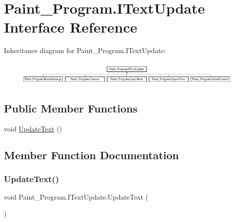 \hypertarget{interface_paint___program_1_1_i_text_update}{}\section{Paint\+\_\+\+Program.\+I\+Text\+Update Interface Reference}
\label{interface_paint___program_1_1_i_text_update}
Inheritance diagram for Paint\+\_\+\+Program.\+I\+Text\+Update\+:\begin{figure}[H]
\begin{center}
\leavevmode
\includegraphics[height=1.217391cm]{interface_paint___program_1_1_i_text_update}
\end{center}
\end{figure}
\subsection*{Public Member Functions}
\begin{DoxyCompactItemize}
\item 
void \mbox{\hyperlink{interface_paint___program_1_1_i_text_update_ad1e94db137571608917117e9a6f7479b}{Update\+Text}} ()
\end{DoxyCompactItemize}


\subsection{Member Function Documentation}
\mbox{\label{interface_paint___program_1_1_i_text_update_ad1e94db137571608917117e9a6f7479b}} 
\subsubsection{\texorpdfstring{Update\+Text()}{UpdateText()}}
{\footnotesize\ttfamily void Paint\+\_\+\+Program.\+I\+Text\+Update.\+Update\+Text (\begin{DoxyParamCaption}{ }\end{DoxyParamCaption})}



